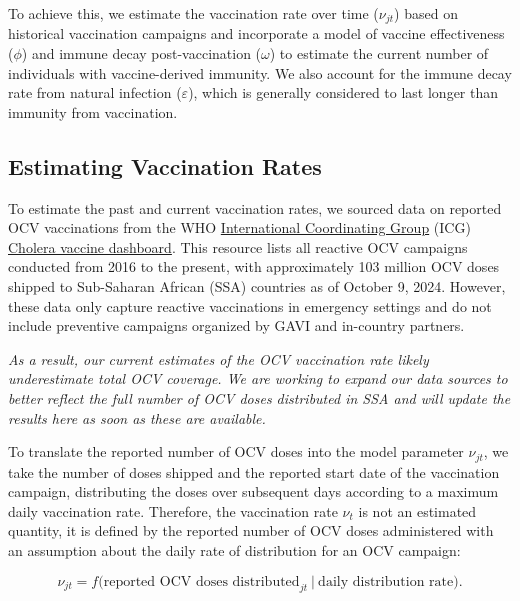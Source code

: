 \documentclass[
]{book}
\begin{document}
To achieve this, we estimate the vaccination rate over time (\(\nu_{jt}\)) based on historical vaccination campaigns and incorporate a model of vaccine effectiveness (\(\phi\)) and immune decay post-vaccination (\(\omega\)) to estimate the current number of individuals with vaccine-derived immunity. We also account for the immune decay rate from natural infection (\(\varepsilon\)), which is generally considered to last longer than immunity from vaccination.

\subsection{Estimating Vaccination Rates}\label{estimating-vaccination-rates}

To estimate the past and current vaccination rates, we sourced data on reported OCV vaccinations from the WHO \href{https://www.who.int/groups/icg}{International Coordinating Group} (ICG) \href{https://app.powerbi.com/view?r=eyJrIjoiYmFmZTBmM2EtYWM3Mi00NWYwLTg3YjgtN2Q0MjM5ZmE1ZjFkIiwidCI6ImY2MTBjMGI3LWJkMjQtNGIzOS04MTBiLTNkYzI4MGFmYjU5MCIsImMiOjh9}{Cholera vaccine dashboard}. This resource lists all reactive OCV campaigns conducted from 2016 to the present, with approximately 103 million OCV doses shipped to Sub-Saharan African (SSA) countries as of October 9, 2024. However, these data only capture reactive vaccinations in emergency settings and do not include preventive campaigns organized by GAVI and in-country partners.

\emph{As a result, our current estimates of the OCV vaccination rate likely underestimate total OCV coverage. We are working to expand our data sources to better reflect the full number of OCV doses distributed in SSA and will update the results here as soon as these are available.}

To translate the reported number of OCV doses into the model parameter \(\nu_{jt}\), we take the number of doses shipped and the reported start date of the vaccination campaign, distributing the doses over subsequent days according to a maximum daily vaccination rate. Therefore, the vaccination rate \(\nu_t\) is not an estimated quantity, it is defined by the reported number of OCV doses administered with an assumption about the daily rate of distribution for an OCV campaign:

\[
\nu_{jt} = f\big(\text{reported OCV doses distributed}_{jt} \ | \ \text{daily distribution rate}\big).
\]
\end{document}
